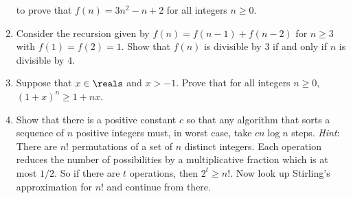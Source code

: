\begin{enumerate}
  to prove that $f(n) = 3n^2-n+2$ for all integers $n\geq 0$.
\item Consider the recursion given by $f(n) = f(n-1)+f(n-2)$ for
  $n\geq 3$ with $f(1)=f(2)=1$. Show that $f(n)$ is divisible by $3$
  if and only if $n$ is divisible by $4$.
\item Suppose that $x\in\reals$ and $x>-1$. Prove that for all
  integers $n\geq 0$, $(1+x)^n\geq 1+nx$.
\item Show that there is a positive constant $c$ so that any algorithm 
 that sorts a sequence of $n$ positive integers must, in worst case, take 
 $cn\log n$ steps. \emph{Hint}:  There are $n!$ permutations of a set of $n$
 distinct integers.  Each operation reduces the number of possibilities
 by a multiplicative fraction which is at most $1/2$.  So if there
 are $t$ operations, then $2^t\ge n!$.  Now look up Stirling's
 approximation for $n!$ and continue from there.
\end{enumerate}

